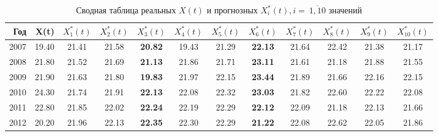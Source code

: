 \begin{table}[ht]
\centering
\caption{Сводная таблица реальных $ X(t)$ и прогнозных $ X_i^{*}(t), i=~\overline{1,10} $ значений} 
\label{table:summary-prediction}
{\footnotesize
\begin{tabular}{r|rcccccccccc}
  \hline
Год & X(t) & $ X^{*}_1(t) $ & $ X^{*}_2(t) $ & \boldmath$ X^{*}_3(t) $ & $ X^{*}_4(t) $ & $ X^{*}_5(t) $ & \boldmath$ X^{*}_6(t) $ & $ X^{*}_7(t) $ & $ X^{*}_8(t) $ & $ X^{*}_9(t) $ & $ X^{*}_{10}(t) $ \\ 
  \hline
2007 & 19.40 & 21.41 & 21.58 & \textbf{20.82} & 19.43 & 21.29 & \textbf{22.13} & 21.64 & 22.42 & 21.38 & 21.17 \\ 
  2008 & 21.80 & 21.52 & 21.69 & \textbf{21.13} & 21.86 & 21.71 & \textbf{23.11} & 21.61 & 21.18 & 21.88 & 21.55 \\ 
  2009 & 21.90 & 21.63 & 21.80 & \textbf{19.83} & 21.97 & 22.15 & \textbf{23.44} & 21.89 & 21.66 & 22.16 & 22.15 \\ 
  2010 & 24.30 & 21.74 & 21.91 & \textbf{22.13} & 22.08 & 22.32 & \textbf{23.03} & 21.82 & 22.60 & 22.22 & 22.08 \\ 
  2011 & 22.80 & 21.85 & 22.02 & \textbf{22.24} & 22.19 & 22.29 & \textbf{22.12} & 22.09 & 21.18 & 22.13 & 21.66 \\ 
  2012 & 20.20 & 21.96 & 22.13 & \textbf{22.35} & 22.30 & 22.29 & \textbf{21.22} & 22.08 & 22.62 & 22.05 & 21.86 \\ 
   \hline
\end{tabular}
}
\end{table}
